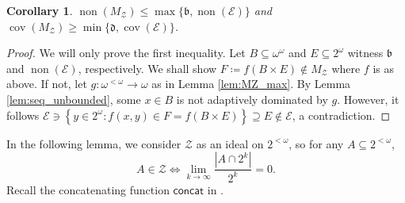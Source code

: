 \documentclass[a4paper,12pt]{amsart}
\newtheorem{cor}[thm]{Corollary}
\theoremstyle{definition}
\numberwithin{thm}{section}
\numberwithin{equation}{section}
\newcommand{\oo}{{\omega}^\omega}
\newcommand{\fsq}{\omega^{<\omega}}
\newcommand{\sq}{2^{<\omega}}
\newcommand{\bb}{\mathfrak{b}}
\newcommand{\dd}{\mathfrak{d}}
\DeclareMathOperator{\non}{non}
\DeclareMathOperator{\cov}{cov}
\newcommand{\none}{\non(\mathcal{E})}
\newcommand{\cove}{\cov(\mathcal{E})}
\newcommand{\set}[2]
{\left\{{#1}:{#2}\right\}}  %
\newcommand{\Z}{\mathcal{Z}}
\begin{document}
    \begin{cor}\label{cor:nonMZ_leq_max}
    	$\non(M_\Z)\leq\max\{\bb,\none\}$ and $\cov(M_\Z)\geq\min\{\dd,\cove\}$.
    \end{cor}
    \begin{proof}
        We will only prove the first inequality. Let $B\subseteq\oo$ and $E\subseteq2^\omega$ witness $\bb$ and $\none$, respectively. We shall show $F\coloneqq f(B\times E)\notin M_\Z$ where $f$ is as above. If not, let $g\colon\fsq\to\omega$ as in Lemma \ref{lem:MZ_max}. By Lemma \ref{lem:seq_unbounded}, some $x\in B$ is not adaptively dominated by $g$. However, it follows $\mathcal{E}\ni \set{y\in2^\omega}{f(x,y)\in  F=f(B\times E)}\supseteq E\notin \mathcal{E}$, a contradiction. 
    \end{proof}
    
    In the following lemma, we consider $\Z$ as an ideal on $\sq$, so for any $A\subseteq\sq$,
    \[
    A\in\Z\iff\lim_{k\to\infty}\frac{|A\cap 2^k|}{2^k}=0.
    \]
    Recall the concatenating function $\mathsf{concat}$ in .
    
\end{document}

